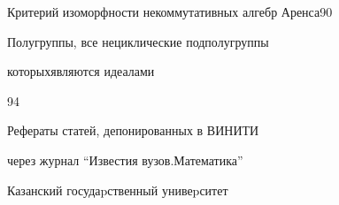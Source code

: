 

{Критерий изоморфности  некоммутативных алгебр Аренса}{90}




{Полугруппы, все нециклические подполугруппы 


которых\newline являются идеалами}{94}


\bigskip





\noindent{}Рефераты статей, депонированных в ВИНИТИ


через журнал ``Известия вузов.\newline Математика''











\vfill


\noindent\raisebox{2pt}{\copyright} Казанский госудаpственный унивеpситет





